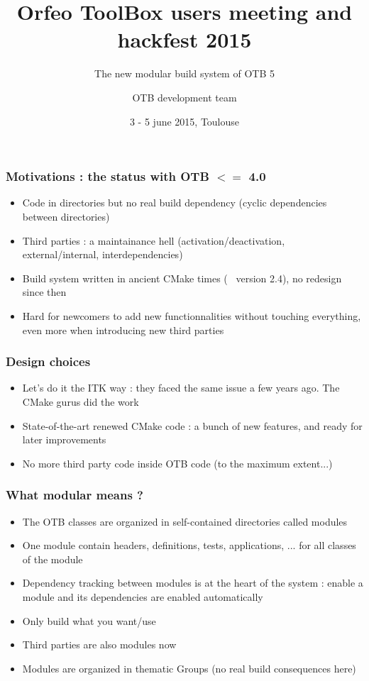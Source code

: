 \documentclass[8pt]{beamer}
\title{Orfeo ToolBox users meeting and hackfest 2015}
\subtitle{The new modular build system of OTB 5}
\author{OTB development team}%
\date{3 - 5 june 2015, Toulouse}
\begin{document}
\begin{frame}
\titlepage
\end{frame}

\begin{frame}
\frametitle{Motivations : the status with OTB $<=$ 4.0}
\begin{itemize}
\item Code in directories but no real build dependency (cyclic dependencies between directories)
\item Third parties : a maintainance hell (activation/deactivation, external/internal, interdependencies)
\item Build system written in ancient CMake times (~ version 2.4), no redesign since then
\item Hard for newcomers to add new functionnalities without touching everything, even more when introducing new third parties
\end{itemize}
\end{frame}

\begin{frame}
\frametitle{Design choices}
\begin{itemize}
\item Let's do it the ITK way : they faced the same issue a few years ago. The CMake gurus did the work
\item State-of-the-art renewed CMake code : a bunch of new features, and ready for later improvements
\item No more third party code inside OTB code (to the maximum extent...)
\end{itemize}
\end{frame}


\begin{frame}
\frametitle{What modular means ?}
\begin{itemize}
\item The OTB classes are organized in self-contained directories called modules
\item One module contain headers, definitions, tests, applications, ... for all classes of the module
\item Dependency tracking between modules is at the heart of the system : enable a module and its dependencies are enabled automatically
\item Only build what you want/use
\item Third parties are also modules now
\item Modules are organized in thematic Groups (no real build consequences here)
\end{itemize}
\end{frame}
\end{document}
